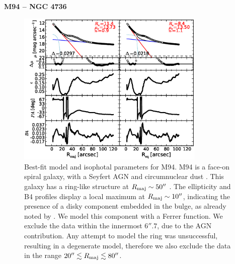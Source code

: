 \documentclass[preprint2]{emulateapj}
\newcommand{\fitfigurewidth}{0.8\textwidth}
\begin{document}
  \clearpage\newpage\noindent
  {\bf M94 -- NGC 4736 \\}

  \begin{figure}[h]
  \begin{center}
  \includegraphics[width=\fitfigurewidth]{images/m94_1Dfit.eps}
  \caption{Best-fit model and isophotal parameters for M94.
  M94 is a face-on spiral galaxy, with a Seyfert AGN \citep{veroncettyveron2006} and 
  circumnuclear dust \citep{elmegreen2002m94,peeplesmartini2006m94}.
  This galaxy has a ring-like structure at $R_{\rm maj} \sim 50''$ \citep{munoztunon1989m94}.
  The ellipticity and B4 profiles display a local maximum at $R_{\rm maj} \sim 10''$, 
  indicating the presence of a disky component embedded in the bulge,
  as already noted by \cite{fisherdrory2010}.
  We model this component with a Ferrer function.
  We exclude the data within the innermost $6''.7$, due to the AGN contribution.
  Any attempt to model the ring was unsuccessful, resulting in a degenerate model, 
  therefore we also exclude the data in the range $20'' \lesssim R_{\rm maj} \lesssim 80''$.
  }
  \end{center}
  \end{figure}
\end{document}

